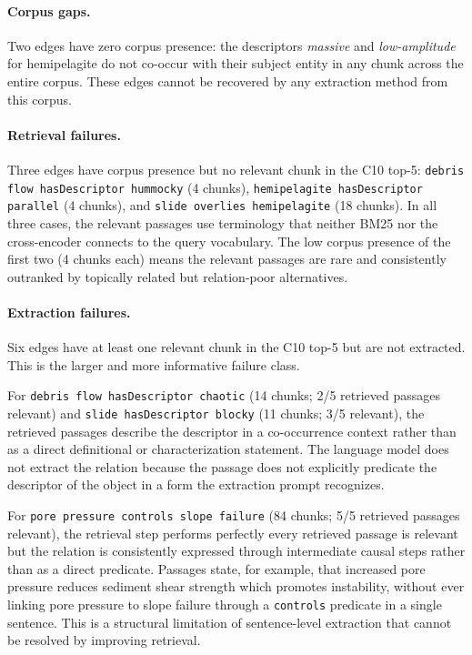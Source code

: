 \documentclass[10pt]{article}
\newcommand{\pred}[1]{\texttt{\small #1}}
\begin{document}
\paragraph{Corpus gaps.}
Two edges have zero corpus presence: the descriptors
\emph{massive} and \emph{low-amplitude} for
hemipelagite do not co-occur with their subject entity
in any chunk across the entire corpus.
These edges cannot be recovered by any extraction
method from this corpus.

\paragraph{Retrieval failures.}
Three edges have corpus presence but no relevant chunk
in the C10 top-5: \pred{debris flow hasDescriptor
hummocky} (4 chunks), \pred{hemipelagite hasDescriptor
parallel} (4 chunks), and \pred{slide overlies
hemipelagite} (18 chunks).
In all three cases, the relevant passages use
terminology that neither BM25 nor the cross-encoder
connects to the query vocabulary.
The low corpus presence of the first two (4 chunks
each) means the relevant passages are rare and
consistently outranked by topically related but
relation-poor alternatives.

\paragraph{Extraction failures.}
Six edges have at least one relevant chunk in the C10
top-5 but are not extracted.
This is the larger and more informative failure class.

For \pred{debris flow hasDescriptor chaotic} (14
chunks; 2/5 retrieved passages relevant) and
\pred{slide hasDescriptor blocky} (11 chunks; 3/5
relevant), the retrieved passages describe the
descriptor in a co-occurrence context rather than as
a direct definitional or characterization statement.
The language model does not extract the relation
because the passage does not explicitly predicate the
descriptor of the object in a form the extraction
prompt recognizes.

For \pred{pore pressure controls slope failure}
(84 chunks; 5/5 retrieved passages relevant), the
retrieval step performs perfectly  every retrieved
passage is relevant  but the relation is
consistently expressed through intermediate causal
steps rather than as a direct predicate.
Passages state, for example, that increased pore
pressure reduces sediment shear strength which
promotes instability, without ever linking pore
pressure to slope failure through a \pred{controls}
predicate in a single sentence.
This is a structural limitation of sentence-level
extraction that cannot be resolved by improving
retrieval.
\end{document}
